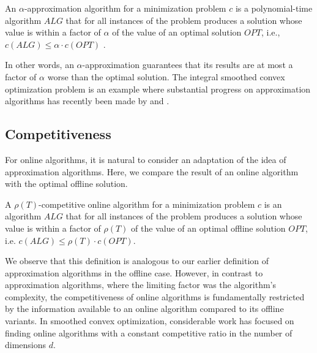 \begin{definition}
An $\alpha$-approximation algorithm for a minimization problem $c$ is a polynomial-time algorithm $ALG$ that for all instances of the problem produces a solution whose value is within a factor of $\alpha$ of the value of an optimal solution $OPT$, i.e., $c(ALG) \leq \alpha \cdot c(OPT)$ \cite{Williamson2011}.
\end{definition}

In other words, an $\alpha$-approximation guarantees that its results are at most a factor of $\alpha$ worse than the optimal solution. The integral smoothed convex optimization problem is an example where substantial progress on approximation algorithms has recently been made by \citeauthor*{Kappelmann2017} and \citeauthor*{Albers2021_2} \cite{Kappelmann2017, Albers2021_2}.

\subsection{Competitiveness}

For online algorithms, it is natural to consider an adaptation of the idea of approximation algorithms. Here, we compare the result of an online algorithm with the optimal offline solution.

\begin{definition}
A $\rho(T)$-competitive online algorithm for a minimization problem $c$ is an algorithm $ALG$ that for all instances of the problem produces a solution whose value is within a factor of $\rho(T)$ of the value of an optimal offline solution $OPT$, i.e. $c(ALG) \leq \rho(T) \cdot c(OPT)$.
\end{definition}

We observe that this definition is analogous to our earlier definition of approximation algorithms in the offline case. However, in contrast to approximation algorithms, where the limiting factor was the algorithm's complexity, the competitiveness of online algorithms is fundamentally restricted by the information available to an online algorithm compared to its offline variants. In smoothed convex optimization, considerable work has focused on finding online algorithms with a constant competitive ratio in the number of dimensions $d$.

